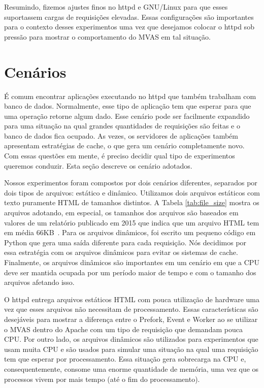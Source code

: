 Resumindo, fizemos ajustes finos no httpd e GNU/Linux para que esses
suportassem cargas de requisições elevadas. Essas configurações são
importantes para o contexto desses experimentos uma vez que desejamos colocar o
httpd sob pressão para mostrar o comportamento do MVAS em tal situação.

\section{Cenários}
\label{sec:scenarios}

É comum encontrar aplicações executando no httpd que também trabalham com banco de
dados. Normalmente, esse tipo de aplicação tem que esperar para que uma
operação retorne algum dado. Esse cenário pode ser facilmente
expandido para uma situação na qual grandes quantidades de requisições são
feitas e o banco de dados fica ocupado. As vezes, os servidores de aplicações
também apresentam estratégias de cache, o que gera um cenário completamente
novo. Com essas questões em mente, é preciso decidir qual tipo de experimentos
queremos conduzir. Esta seção descreve os cenário adotados.



Nossos experimentos foram compostos por dois cenários diferentes, separados por dois
tipos de arquivos: estático e dinâmico. Utilizamos dois arquivos estáticos
com texto puramente HTML de tamanhos distintos. A Tabela \ref{tab:file_size}
mostra os arquivos adotando, em especial, os tamanhos dos arquivos são baseados
em valores de um relatório publicado em 2015 que indica que um arquivo HTML
tem em média 66KB~\citep{httpachieve}. Para os arquivos dinâmicos, foi escrito
um pequeno código em Python que gera uma saída diferente para cada requisição. Nós
decidimos por essa estratégia com os arquivos dinâmicos para evitar os sistemas
de cache. Finalmente, os arquivos dinâmicos são importantes em um cenário em
que a CPU deve ser mantida ocupada por um período maior de tempo e com o
tamanho dos arquivos afetando isso.

O httpd entrega arquivos estáticos HTML com pouca utilização de hardware uma
vez que esses arquivos não necessitam de processamento. Essas características
são desejáveis para mostrar a diferença entre o Prefork, Event e Worker ao se
utilizar o MVAS dentro do Apache com um tipo de requisição que demandam
pouca CPU. Por outro lado, os arquivos dinâmicos são utilizados para
experimentos que usam muita CPU e são usados para simular uma situação na qual
uma requisição tem que esperar por processamento. Essa situação gera sobrecarga
na CPU e, consequentemente, consome uma enorme quantidade de memória, uma vez que
os processos vivem por mais tempo (até o fim do processamento).

